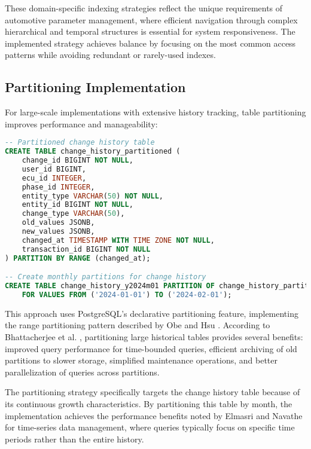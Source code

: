 These domain-specific indexing strategies reflect the unique requirements of automotive parameter management, where efficient navigation through complex hierarchical and temporal structures is essential for system responsiveness. The implemented strategy achieves balance by focusing on the most common access patterns while avoiding redundant or rarely-used indexes.

\subsection{Partitioning Implementation}
\label{subsec:partitioning-implementation}

For large-scale implementations with extensive history tracking, table partitioning improves performance and manageability:

\begin{lstlisting}[language=SQL, caption={Table Partitioning Implementation}, label={lst:table-partitioning}]
-- Partitioned change history table
CREATE TABLE change_history_partitioned (
    change_id BIGINT NOT NULL,
    user_id BIGINT,
    ecu_id INTEGER,
    phase_id INTEGER,
    entity_type VARCHAR(50) NOT NULL,
    entity_id BIGINT NOT NULL,
    change_type VARCHAR(50),
    old_values JSONB,
    new_values JSONB,
    changed_at TIMESTAMP WITH TIME ZONE NOT NULL,
    transaction_id BIGINT NOT NULL
) PARTITION BY RANGE (changed_at);

-- Create monthly partitions for change history
CREATE TABLE change_history_y2024m01 PARTITION OF change_history_partitioned
    FOR VALUES FROM ('2024-01-01') TO ('2024-02-01');
\end{lstlisting}

This approach uses PostgreSQL's declarative partitioning feature, implementing the range partitioning pattern described by Obe and Hsu \cite{obe2017postgresql}. According to Bhattacherjee et al. \cite{bhattacherjee2015principles}, partitioning large historical tables provides several benefits: improved query performance for time-bounded queries, efficient archiving of old partitions to slower storage, simplified maintenance operations, and better parallelization of queries across partitions.

The partitioning strategy specifically targets the change history table because of its continuous growth characteristics. By partitioning this table by month, the implementation achieves the performance benefits noted by Elmasri and Navathe \cite{elmasri2015fundamentals} for time-series data management, where queries typically focus on specific time periods rather than the entire history.

